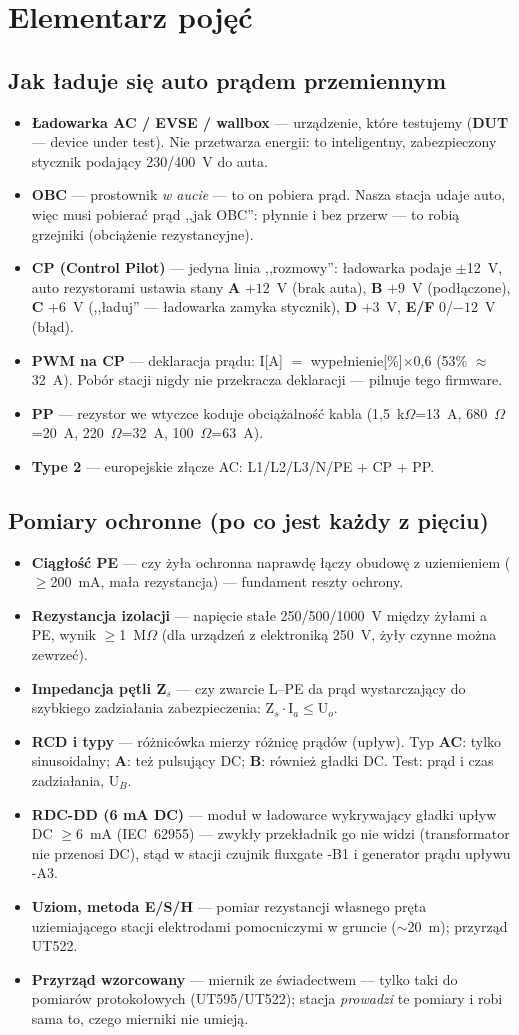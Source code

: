 \documentclass[11pt,a4paper]{article}
\newcommand{\ohm}{$\Omega$}
\newcommand{\poj}[2]{\item \textbf{#1} --- #2}
\begin{document}
\section{Elementarz pojęć}
\label{sec:elementarz}
\subsection{Jak ładuje się auto prądem przemiennym}
\begin{itemize}
\poj{Ładowarka AC / EVSE / wallbox}{urządzenie, które testujemy (\textbf{DUT} --- device under
test). Nie przetwarza energii: to inteligentny, zabezpieczony stycznik podający 230/400~V do auta.}
\poj{OBC}{prostownik \emph{w aucie} --- to on pobiera prąd. Nasza stacja udaje auto, więc musi
pobierać prąd ,,jak OBC'': płynnie i bez przerw --- to robią grzejniki (obciążenie rezystancyjne).}
\poj{CP (Control Pilot)}{jedyna linia ,,rozmowy'': ładowarka podaje $\pm$12~V, auto rezystorami
ustawia stany \textbf{A} $+12$~V (brak auta), \textbf{B} $+9$~V (podłączone), \textbf{C} $+6$~V
(,,ładuj'' --- ładowarka zamyka stycznik), \textbf{D} $+3$~V, \textbf{E/F} 0/$-12$~V (błąd).}
\poj{PWM na CP}{deklaracja prądu: I[A] $=$ wypełnienie[\%]$\times$0,6 (53\% $\approx$ 32~A).
Pobór stacji nigdy nie przekracza deklaracji --- pilnuje tego firmware.}
\poj{PP}{rezystor we wtyczce koduje obciążalność kabla (1,5~k\ohm=13~A, 680~\ohm=20~A,
220~\ohm=32~A, 100~\ohm=63~A).}
\poj{Type 2}{europejskie złącze AC: L1/L2/L3/N/PE $+$ CP $+$ PP.}
\end{itemize}
\subsection{Pomiary ochronne (po co jest każdy z pięciu)}
\begin{itemize}
\poj{Ciągłość PE}{czy żyła ochronna naprawdę łączy obudowę z uziemieniem ($\ge$200~mA, mała
rezystancja) --- fundament reszty ochrony.}
\poj{Rezystancja izolacji}{napięcie stałe 250/500/1000~V między żyłami a PE, wynik $\ge$1~M\ohm{}
(dla urządzeń z elektroniką 250~V, żyły czynne można zewrzeć).}
\poj{Impedancja pętli Z$_s$}{czy zwarcie L--PE da prąd wystarczający do szybkiego zadziałania
zabezpieczenia: Z$_s\cdot$I$_a\le$U$_o$.}
\poj{RCD i typy}{różnicówka mierzy różnicę prądów (upływ). Typ \textbf{AC}: tylko sinusoidalny;
\textbf{A}: też pulsujący DC; \textbf{B}: również gładki DC. Test: prąd i czas zadziałania, U$_B$.}
\poj{RDC-DD (6 mA DC)}{moduł w ładowarce wykrywający gładki upływ DC $\ge$6~mA (IEC~62955) ---
zwykły przekładnik go nie widzi (transformator nie przenosi DC), stąd w stacji czujnik fluxgate
-B1 i generator prądu upływu -A3.}
\poj{Uziom, metoda E/S/H}{pomiar rezystancji własnego pręta uziemiającego stacji elektrodami
pomocniczymi w gruncie ($\sim$20~m); przyrząd UT522.}
\poj{Przyrząd wzorcowany}{miernik ze świadectwem --- tylko taki do pomiarów protokołowych
(UT595/UT522); stacja \emph{prowadzi} te pomiary i robi sama to, czego mierniki nie umieją.}
\end{itemize}
\end{document}
